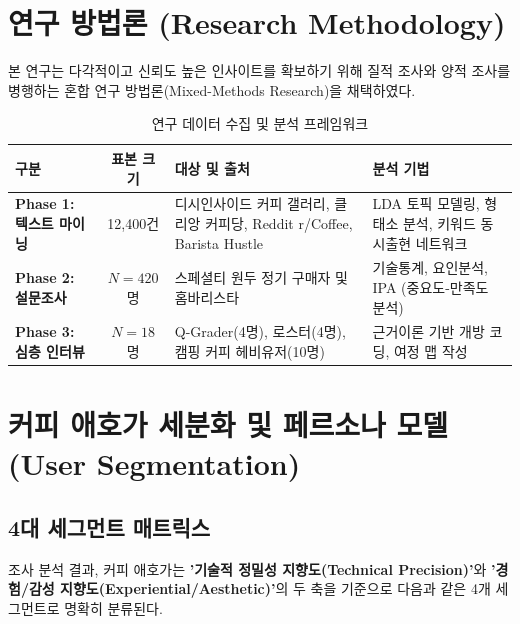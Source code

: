 \documentclass[10pt,a4paper]{article}
\begin{document}
\section{연구 방법론 (Research Methodology)}

본 연구는 다각적이고 신뢰도 높은 인사이트를 확보하기 위해 질적 조사와 양적 조사를 병행하는 혼합 연구 방법론(Mixed-Methods Research)을 채택하였다.

\begin{table}[h!]
\centering
\small
\caption{연구 데이터 수집 및 분석 프레임워크}
\vspace{4pt}
\begin{tabularx}{\textwidth}{lcp{6.5cm}X}
\toprule
\textbf{구분} & \textbf{표본 크기} & \textbf{대상 및 출처} & \textbf{분석 기법} \\
\midrule
\textbf{Phase 1: 텍스트 마이닝} & 12,400건 & 디시인사이드 커피 갤러리, 클리앙 커피당, Reddit r/Coffee, Barista Hustle & LDA 토픽 모델링, 형태소 분석, 키워드 동시출현 네트워크 \\
\textbf{Phase 2: 설문조사} & $N=420$명 & 스페셜티 원두 정기 구매자 및 홈바리스타 & 기술통계, 요인분석, IPA (중요도-만족도 분석) \\
\textbf{Phase 3: 심층 인터뷰} & $N=18$명 & Q-Grader(4명), 로스터(4명), 캠핑 커피 헤비유저(10명) & 근거이론 기반 개방 코딩, 여정 맵 작성 \\
\bottomrule
\end{tabularx}
\end{table}

\section{커피 애호가 세분화 및 페르소나 모델 (User Segmentation)}

\subsection{4대 세그먼트 매트릭스}
조사 분석 결과, 커피 애호가는 \textbf{'기술적 정밀성 지향도(Technical Precision)'}와 \textbf{'경험/감성 지향도(Experiential/Aesthetic)'}의 두 축을 기준으로 다음과 같은 4개 세그먼트로 명확히 분류된다.
\end{document}
